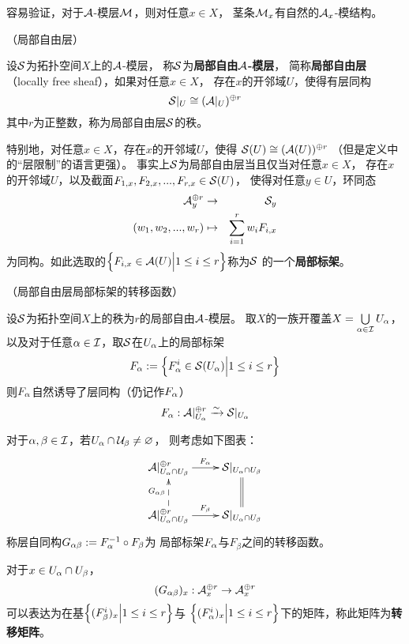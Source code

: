 容易验证，对于$\mathcal{A}$-模层$\mathcal{M}$，则对任意$x\in X$，
茎条$\mathcal{M}_x$有自然的$\mathcal{A}_x$-模结构。

\begin{definition}（局部自由层）

设$\mathcal{S}$为拓扑空间$X$上的$\mathcal{A}$-模层，
称$\mathcal{S}$为\textbf{局部自由$\mathcal{A}$-模层}，
简称\textbf{局部自由层}（locally free sheaf），如果对任意$x\in X$，
存在$x$的开邻域$U$，使得有层同构
$$\mathcal{S}|_U\cong(\mathcal{A}|_U)^{\oplus r}$$
其中$r$为正整数，称为局部自由层$\mathcal{S}$的秩。
\end{definition}

特别地，对任意$x\in X$，存在$x$的开邻域$U$，使得
$\mathcal{S}(U)\cong(\mathcal{A}(U))^{\oplus r}$
（但是定义中的“层限制”的语言更强）。
事实上$\mathcal{S}$为局部自由层当且仅当对任意$x\in X$，
存在$x$的开邻域$U$，以及截面$F_{1,x},F_{2,x},...,F_{r,x}\in\mathcal{S}(U)$，
使得对任意$y\in U$，环同态
\begin{eqnarray*}
     \mathcal{A}_y^{\oplus r}&\to&\mathcal{S}_y\\
     (w_1,w_2,...,w_r)
&\mapsto&\sum_{i=1}^{r}w_iF_{i,x}
\end{eqnarray*}
为同构。如此选取的$\Big\{ F_{i,x}\in\mathcal{A}(U) \Big| 1\leq i\leq r \Big\}$称为$\mathcal{S}$
的一个\textbf{局部标架}。

\begin{notation}（局部自由层局部标架的转移函数）

设$\mathcal{S}$为拓扑空间$X$上的秩为$r$的局部自由$\mathcal{A}$-模层。
取$X$的一族开覆盖$X=\bigcup\limits_{\alpha\in\mathcal{I}}U_\alpha$，
以及对于任意$\alpha\in\mathcal{I}$，取$\mathcal{S}$在$U_\alpha$上的局部标架
$$F_\alpha:=\Big\{ F_\alpha^i\in\mathcal{S}(U_\alpha) \Big| 1\leq i\leq r \Big\}$$
则$F_\alpha$自然诱导了层同构（仍记作$F_\alpha$）
$$F_\alpha:\mathcal{A}|_{U_\alpha}^{\oplus r}\xrightarrow{\sim}\mathcal{S}|_{U_\alpha}$$

对于$\alpha,\beta\in\mathcal{I}$，若$U_\alpha\cap\mathcal{U}_\beta\neq\varnothing$，
则考虑如下图表：
$$
  \xymatrix{
     \mcalA|_{U_\afa\cap U_\beta}^{\oplus r}
       \ar[r]^{F_\afa}
    &\mcalS|_{U_\afa\cap U_\beta}
       \ar@{=}[d]
  \\
     \mcalA|_{U_\afa\cap U_\beta}^{\oplus r}
       \ar[r]^{F_\beta}
       \ar@{-->}[u]^{G_{\afa\beta}}
    &\mcalS|_{U_\afa\cap U_\beta}
  }
$$
称层自同构$G_{\alpha\beta}:=F_\alpha^{-1}\circ F_\beta$为
局部标架$F_\alpha$与$F_\beta$之间的转移函数。
\end{notation}

对于$x\in U_\alpha\cap U_\beta$，
$$(G_{\alpha\beta})_x:\mathcal{A}_x^{\oplus r}\to\mathcal{A}_x^{\oplus r}$$
可以表达为在基$\Big\{ (F_\beta^i)_x \Big| 1\leq i\leq r \Big\}$与
$\Big\{ (F_\alpha^i)_x \Big| 1\leq i\leq r \Big\}$下的矩阵，称此矩阵为\textbf{转移矩阵}。

